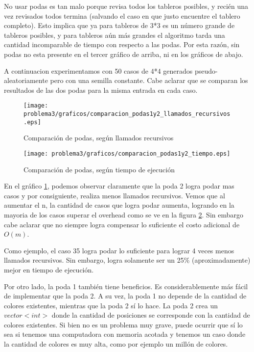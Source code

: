 No usar podas es tan malo porque revisa todos los tableros posibles, y recién una vez revisados todos termina (salvando el caso en que justo encuentre el tablero completo). Esto implica que ya para tableros de 3*3 es un número grande de tableros posibles, y para tableros aún más grandes el algoritmo tarda una cantidad incomparable de tiempo con respecto a las podas. Por esta razón, sin podas no esta presente en el tercer gráfico de arriba, ni en los gráficos de abajo.

A continuacion experimentamos con 50 casos de 4*4 generados pseudo-aleatoriamente pero con una semilla constante. Cabe aclarar que se comparan los resultados de las dos podas para la misma entrada en cada caso.

\begin{center}
  \begin{figure}[H]
    \texttt{[image: problema3/graficos/comparacion\_podas1y2\_llamados\_recursivos.eps]}
    \caption{Comparación de podas, según llamados recursivos}
    \label{fig:problema3-podas-llamados}
  \end{figure}
\end{center}

\begin{center}
  \begin{figure}[H]
\texttt{[image: problema3/graficos/comparacion\_podas1y2\_tiempo.eps]}
    \caption{Comparación de podas, según tiempo de ejecución}
    \label{fig:problema3-podas-tiempo}
  \end{figure}
\end{center}


En el gráfico \ref{fig:problema3-podas-llamados}, podemos observar claramente que la poda 2 logra podar mas casos y por consiguiente, realiza menos llamados recursivos. Vemos que al aumentar el n, la cantidad de casos que logra podar aumenta, logrando en la mayoria de los casos superar el overhead como se ve en la figura \ref{fig:problema3-podas-tiempo}. Sin embargo cabe aclarar que no siempre logra compensar lo suficiente el costo adicional de $O(m)$.

Como ejemplo, el caso 35 logra podar lo suficiente para lograr 4 veces menos llamados recursivos. Sin embargo, logra solamente ser un 25\% (aproximadamente) mejor en tiempo de ejecución.

Por otro lado, la poda 1 también tiene beneficios. Es considerablemente más fácil de implementar que la poda 2. A su vez, la poda 1 no depende de la cantidad de colores existentes, mientras que la poda 2 sí lo hace. La poda 2 crea un $vector<int>$ donde la cantidad de posiciones se corresponde con la cantidad de colores existentes. Si bien no es un problema muy grave, puede ocurrir que sí lo sea si tenemos una computadora con memoria acotada y tenemos un caso donde la cantidad de colores es muy alta, como por ejemplo un millón de colores.

